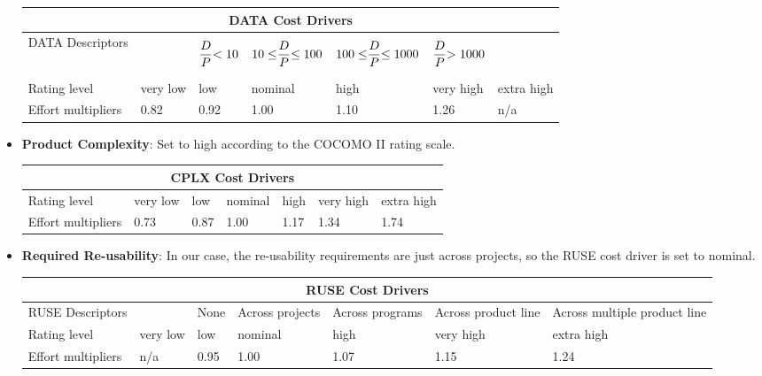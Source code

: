 \begin{itemize}
\begin{longtable}{| m{}| m{} | m{} | m{} | m{} | m{} | m{}| }
\hline
\multicolumn{7}{c}{DATA Cost Drivers}\\
\hline
\hline
DATA Descriptors &  & \begin{equation*}
 {D \over P} {<10} 
\end{equation*} & 
\begin{equation*}
{10\le} {D \over P} {\le 100}
\end{equation*}& 
\begin{equation*}
{100\le} {D \over P} {\le 1000}
\end{equation*} & 
\begin{equation*}
 {D \over P} {>1000} 
\end{equation*}
& \\
\hline
Rating level & very low & low & nominal & high & very high & extra high \\
\hline
Effort multipliers & 0.82 & 0.92 & 1.00 & 1.10 & 1.26 & n/a \\
\hline
\end{longtable}

\item \textbf{Product Complexity}:
Set to high according to the COCOMO II rating scale.

\begin{longtable}{| m{}| m{} | m{} | m{} | m{} | m{} | m{}| }
\hline
\multicolumn{7}{c}{CPLX Cost Drivers}\\
\hline
\hline
Rating level & very low & low & nominal & high & very high & extra high \\
\hline
Effort multipliers & 0.73 & 0.87 & 1.00 & 1.17 & 1.34 & 1.74 \\
\hline
\end{longtable}

\item \textbf{Required Re-usability}:
In our case, the re-usability requirements are just across projects, so the RUSE cost driver is set to nominal.

\begin{longtable}{| m{}| m{} | m{} | m{} | m{} | m{} | m{}| }
\hline
\multicolumn{7}{c}{RUSE Cost Drivers}\\
\hline
\hline
RUSE Descriptors &  & None & Across projects & Across programs & Across product line & Across multiple product line\\
\hline
Rating level & very low & low & nominal & high & very high & extra high \\
\hline
Effort multipliers & n/a & 0.95 & 1.00 & 1.07 & 1.15 & 1.24 \\
\hline
\end{longtable}


\end{itemize}
